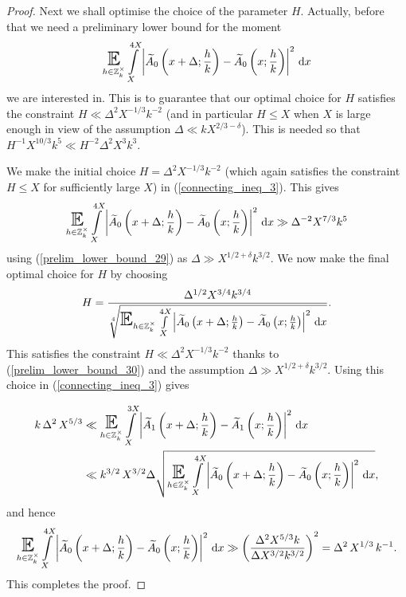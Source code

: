 \documentclass[a4paper,10pt,twoside]{amsart}
\theoremstyle{definition}
\numberwithin{equation}{section}
\newcommand\E{\mathbb{E}}
\renewcommand\:{\colon}
\begin{document}
\begin{proof}
Next we shall optimise the choice of the parameter $H$. Actually, before that we need a preliminary lower bound for the moment 
\begin{align*}
\mathop{\text{\LARGE$\E$}}_{h\in\mathbb Z_k^\times}\int\limits_X^{4X}\left|\widetilde A_0\left(x+\Delta;\frac hk\right)-\widetilde A_0\left(x;\frac hk\right)\right|^2\,\mathrm dx
\end{align*}
we are interested in. This is to guarantee that our optimal choice for $H$ satisfies the constraint $H\ll \Delta^2X^{-1/3}k^{-2}$ (and in particular $H\leq X$ when $X$ is large enough in view of the assumption $\Delta\ll kX^{2/3-\delta}$). This is needed so that $H^{-1}X^{10/3}k^5\ll H^{-2}\Delta^2X^3k^3$.

We make the initial choice $H=\Delta^2X^{-1/3}k^{-2}$ (which again satisfies the constraint $H\leq X$ for sufficiently large $X$) in (\ref{connecting_ineq_3}). This gives
\begin{align}\label{prelim_lower_bound_30}
\mathop{\text{\LARGE$\E$}}_{h\in\mathbb Z_k^\times}\int\limits_X^{4X}\left|\widetilde A_0\left(x+\Delta;\frac hk\right)-\widetilde A_0\left(x;\frac hk\right)\right|^2\,\mathrm dx\gg \Delta^{-2}X^{7/3}k^5
\end{align}
using (\ref{prelim_lower_bound_29}) as $\Delta\gg X^{1/2+\delta}k^{3/2}$. We now make the final optimal choice for $H$ by choosing
\[ 
H=\frac{\Delta^{1/2}X^{3/4}k^{3/4}}{\sqrt[4]{\mathop{\text{\LARGE$\E$}}_{h\in\mathbb Z_k^\times}\int\limits_X^{4X}\left|\widetilde A_0\left(x+\Delta;\frac hk\right)-\widetilde A_0\left(x;\frac hk\right)\right|^2\,\mathrm dx}}.
\]
This satisfies the constraint $H\ll \Delta^2X^{-1/3}k^{-2}$ thanks to (\ref{prelim_lower_bound_30}) and the assumption $\Delta\gg X^{1/2+\delta}k^{3/2}$. Using this choice in (\ref{connecting_ineq_3}) gives
 
\begin{align*}
k\,\Delta^2\,X^{5/3}&\ll \mathop{\text{\LARGE$\E$}}_{h\in\mathbb Z_k^\times}\int\limits_X^{3X}\left|\widetilde A_1\left(x+\Delta;\frac hk\right)-\widetilde A_1\left(x;\frac hk\right)\right|^2\,\mathrm dx\\
&\ll k^{3/2}\,X^{3/2}\Delta\sqrt{\mathop{\text{\LARGE$\E$}}_{h\in\mathbb Z_k^\times}\int\limits_X^{4X}\left|\widetilde A_0\left(x+\Delta;\frac hk\right)-\widetilde A_0\left(x;\frac hk\right)\right|^2\,\mathrm dx},
\end{align*}
and hence
\[\mathop{\text{\LARGE$\E$}}_{h\in\mathbb Z_k^\times}\int\limits_X^{4X}\left|\widetilde A_0\left(x+\Delta;\frac hk\right)-\widetilde A_0\left(x;\frac hk\right)\right|^2\,\mathrm dx\gg\left(\frac{\Delta^2 X^{5/3}k}{\Delta X^{3/2}k^{3/2}}\right)^2=\Delta^2\,X^{1/3}\,k^{-1}.\]
This completes the proof. 
\end{proof}        
            
\end{document}

